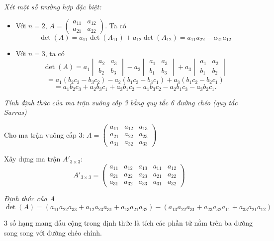 \textit{Xét một số trường hợp đặc biệt:}
\begin{itemize}
    \item Với \( n = 2 \), \( A = \begin{pmatrix}
    a_{11} & a_{12} \\
    a_{21} & a_{22}
    \end{pmatrix} \). Ta có
    \[
    \det(A) = a_{11}\det(A_{11}) + a_{12}\det(A_{12}) = a_{11}a_{22} - a_{21}a_{12}
    \]

    \item Với \( n = 3 \), ta có
    \[
    \det(A) = a_1 \begin{vmatrix}
    a_2 & a_3 \\
    b_2 & b_3
    \end{vmatrix} - a_2 \begin{vmatrix}
    a_1 & a_3 \\
    b_1 & b_3
    \end{vmatrix} + a_3 \begin{vmatrix}
    a_1 & a_2 \\
    b_1 & b_2
    \end{vmatrix}
    \]
    \[
    = a_1(b_2c_3 - b_3c_2) - a_2(b_1c_3 - b_3c_1) + a_3(b_1c_2 - b_2c_1)
    \]
    \[
    = a_1b_2c_3 + a_2b_3c_1 + a_3b_1c_2 - a_1b_3c_2 - a_2b_1c_3 - a_3b_2c_1.
    \]
\end{itemize}

\textit{Tính định thức của ma trận vuông cấp 3 bằng quy tắc 6 đường chéo (quy tắc Sarrus)}

Cho ma trận vuông cấp 3: \( A = \begin{pmatrix}
a_{11} & a_{12} & a_{13} \\
a_{21} & a_{22} & a_{23} \\
a_{31} & a_{32} & a_{33}
\end{pmatrix} \)

Xây dựng ma trận \( A'_{3 \times 3} \):
\[
A'_{3 \times 3} = \begin{pmatrix}
a_{11} & a_{12} & a_{13} & a_{11} & a_{12} \\
a_{21} & a_{22} & a_{23} & a_{21} & a_{22} \\
a_{31} & a_{32} & a_{33} & a_{31} & a_{32}
\end{pmatrix}
\]

\textit{Định thức của A}
\[
\det(A) = (a_{11}a_{22}a_{33} + a_{12}a_{23}a_{31} + a_{13}a_{21}a_{32}) - (a_{13}a_{22}a_{31} + a_{23}a_{32}a_{11} + a_{33}a_{21}a_{12})
\]

3 số hạng mang dấu cộng trong định thức là tích các phần tử nằm trên ba đường song song với đường chéo chính.

